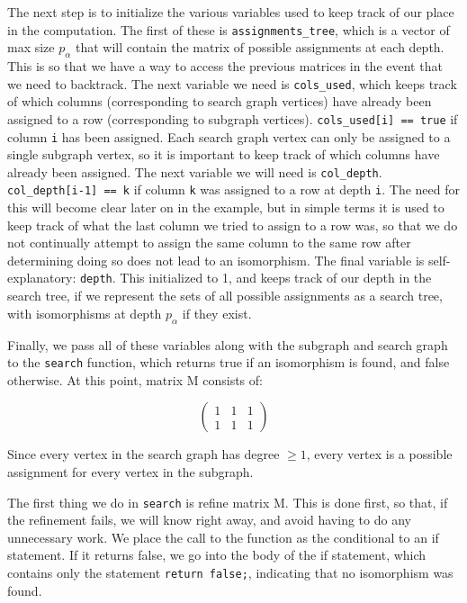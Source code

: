 \documentclass{article}
\begin{document}
  The next step is to initialize the various variables used to keep track of our place in the computation. The first of these is \texttt{assignments\_tree}, which is a vector of max size $p_{\alpha}$ that will contain the matrix of possible assignments at each depth. This is so that we have a way to access the previous matrices in the event that we need to backtrack. The next variable we need is \texttt{cols\_used}, which keeps track of which columns (corresponding to search graph vertices) have already been assigned to a row (corresponding to subgraph vertices). \texttt{cols\_used[i] == true} if column \texttt{i} has been assigned. Each search graph vertex can only be assigned to a single subgraph vertex, so it is important to keep track of which columns have already been assigned. The next variable we will need is \texttt{col\_depth}. \texttt{col\_depth[i-1] == k} if column \texttt{k} was assigned to a row at depth \texttt{i}. The need for this will become clear later on in the example, but in simple terms it is used to keep track of what the last column we tried to assign to a row was, so that we do not continually attempt to assign the same column to the same row after determining doing so does not lead to an isomorphism. The final variable is self-explanatory: \texttt{depth}. This initialized to 1, and keeps track of our depth in the search tree, if we represent the sets of all possible assignments as a search tree, with isomorphisms at depth $p_{\alpha}$ if they exist.

  Finally, we pass all of these variables along with the subgraph and search graph to the \texttt{search} function, which returns true if an isomorphism is found, and false otherwise. At this point, matrix M consists of:
  
  \[ \begin{pmatrix}
      1 & 1 & 1 \\
      1 & 1 & 1
  \end{pmatrix} \]

  Since every vertex in the search graph has degree $\geq 1$, every vertex is a possible assignment for every vertex in the subgraph.

  The first thing we do in \texttt{search} is refine matrix M. This is done first, so that, if the refinement fails, we will know right away, and avoid having to do any unnecessary work. We place the call to the function as the conditional to an if statement. If it returns false, we go into the body of the if statement, which contains only the statement \texttt{return false;}, indicating that no isomorphism was found.
\end{document}

